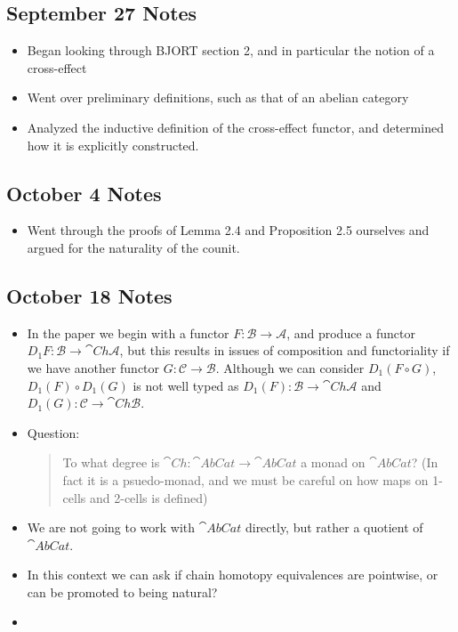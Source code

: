 \subsection{September 27 Notes}


\begin{itemize}
    \item Began looking through BJORT\cite{BJORT} section 2, and in particular the notion of a cross-effect 
    \item Went over preliminary definitions, such as that of an abelian category
    \item Analyzed the inductive definition of the cross-effect functor, and determined how it is explicitly constructed.
\end{itemize}


\subsection{October 4 Notes}


\begin{itemize}
    \item Went through the proofs of Lemma 2.4 and Proposition 2.5 ourselves and argued for the naturality of the counit.
\end{itemize}



\subsection{October 18 Notes}


\begin{itemize}
    \item In the paper we begin with a functor $F:\mathcal{B}\rightarrow \mathcal{A}$, and produce a functor $D_1F:\mathcal{B}\rightarrow \cat{Ch}\mathcal{A}$, but this results in issues of composition and functoriality if we have another functor $G:\mathcal{C}\rightarrow \mathcal{B}$. Although we can consider $D_1(F\circ G)$, $D_1(F)\circ D_1(G)$ is not well typed as $D_1(F):\mathcal{B}\rightarrow \cat{Ch}\mathcal{A}$ and $D_1(G):\mathcal{C}\rightarrow \cat{Ch}\mathcal{B}$.
    \item Question:
    \begin{quotation}
        \noindent To what degree is $\cat{Ch}:\cat{AbCat}\rightarrow \cat{AbCat}$ a monad on $\cat{AbCat}$? (In fact it is a psuedo-monad, and we must be careful on how maps on 1-cells and 2-cells is defined)
    \end{quotation}
    \item We are not going to work with $\cat{AbCat}$ directly, but rather a quotient of $\cat{AbCat}$. 
    \item In this context we can ask if chain homotopy equivalences are pointwise, or can be promoted to being natural?
    \item 
\end{itemize}